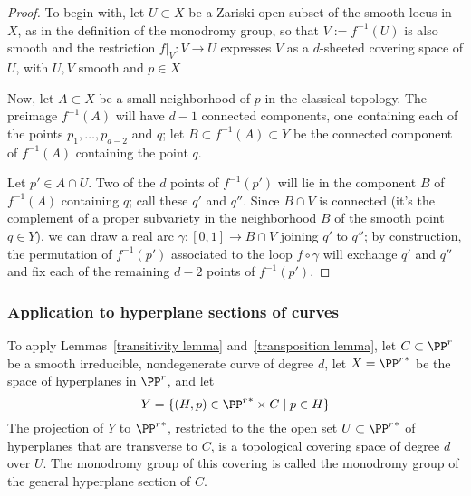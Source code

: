 \begin{proof} To begin with, let $U \subset X$ be a Zariski open subset of the smooth locus in $X$, as in the definition of the monodromy group, so that  $V := f^{-1}(U)$ is also smooth and the restriction $f|_V : V \to U$ expresses $V$ as a $d$-sheeted covering space of $U$, with $U,V$ smooth and $p\in X$

Now, let $A \subset X$ be a small neighborhood of $p$ in the classical topology. The preimage $f^{-1}(A)$ will have $d-1$ connected components, one containing each of the points $p_1,\dots,p_{d-2}$ and $q$; let
 $B \subset f^{-1}(A) \subset Y$ be the connected component of $f^{-1}(A)$ containing the point $q$.

Let $p' \in A \cap U$. Two of the $d$ points of $f^{-1}(p')$ will lie in the component $B$ of $f^{-1}(A)$ containing $q$; call these $q'$ and $q''$. Since $B \cap V$ is connected (it's the complement of a proper subvariety in the neighborhood $B$ of the smooth point $q \in Y$), we can draw a real arc $\gamma : [0,1] \to B \cap V$ joining $q'$ to $q''$; by construction, the permutation of $f^{-1}(p')$ associated to the loop $f \circ \gamma$ will exchange $q'$ and $q''$ and fix each of the remaining $d-2$ points of $f^{-1}(p')$.
\end{proof}

\subsubsection{Application to hyperplane sections of curves}

To apply Lemmas~\ref{transitivity lemma} and~\ref{transposition lemma}, let $C \subset \PP^r$ be a smooth irreducible, nondegenerate curve of degree $d$, let $X = {\PP^r}^*$ be the space of hyperplanes in $\PP^r$, and let
$$
Y = \{ (H, p) \in {\PP^r}^* \times C \mid p \in H \}
$$
The projection of $Y$ to ${\PP^r}^*$, restricted to the the open set $U\subset {\PP^r}^*$
of hyperplanes that are transverse to $C$, is a topological covering space of degree $d$ over   $U$. The monodromy group of this covering is called the monodromy group of the general hyperplane section of $C$. 


